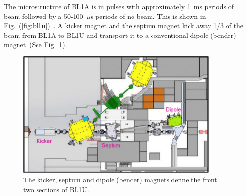 The microstructure of BL1A is in pulses with approximately 1~ms
periods of beam followed by a 50-100~$\mu$s periods of no beam.  This
is shown in Fig.~(\ref{fig:bl1u})~\cite{Nick_thesis}. A kicker magnet
and the septum magnet kick away 1/3 of the beam from BL1A to BL1U and
transport it to a conventional dipole (bender) magnet~(See
Fig.~\ref{fig:magnets}).

\begin{figure}[h!]
  \centering
  \includegraphics[width=0.9\textwidth]{magnets.png}
  \caption{The kicker, septum and dipole (bender) magnets define the
    front two sections of BL1U.}
  \label{fig:magnets}
\end{figure}

